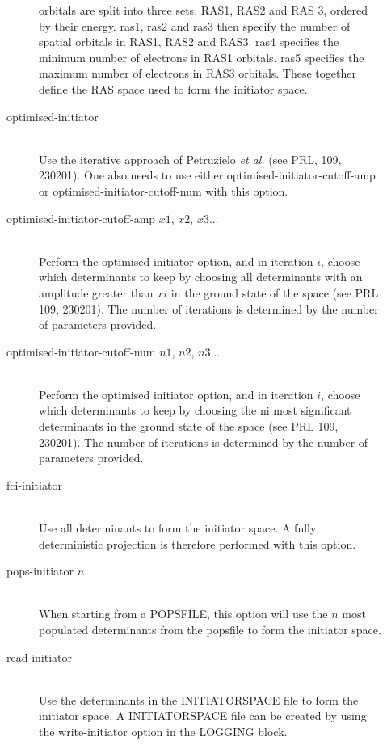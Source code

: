 \documentclass[a4paper,notitlepage]{scrreprt}
\newcommand\codeitem[1]{\needspace{1.5\baselineskip}\item[\textnormal{\ttfamily #1 \nopagebreak}] \hfill \\ \nopagebreak}
\begin{document}
\begin{description}
\begin{description}
    orbitals are split into three sets, RAS1, RAS2 and RAS 3, ordered
    by their energy. ras1, ras2 and ras3 then specify the number of
    spatial orbitals in RAS1, RAS2 and RAS3. ras4 specifies the minimum
    number of electrons in RAS1 orbitals. ras5 specifies the maximum
    number of electrons in RAS3 orbitals. These together define the RAS
    space used to form the initiator space.
    \codeitem{optimised-initiator}
    Use the iterative approach of Petruzielo \emph{et al.} (see PRL,
    109, 230201). One also needs to use either optimised-initiator-cutoff-amp
    or optimised-initiator-cutoff-num with this option.
    \codeitem{optimised-initiator-cutoff-amp $x1$, $x2$, $x3$...}
    Perform the optimised initiator option, and in iteration $i$, choose
    which determinants to keep by choosing all determinants with an
    amplitude greater than $xi$ in the ground state of the space (see
    PRL 109, 230201). The number of iterations is determined by the
    number of parameters provided.
    \codeitem{optimised-initiator-cutoff-num $n1$, $n2$, $n3$...}
    Perform the optimised initiator option, and in iteration $i$, choose
    which determinants to keep by choosing the ni most significant
    determinants in the ground state of the space (see PRL 109, 230201).
    The number of iterations is determined by the number of parameters
    provided.
    \codeitem{fci-initiator}
    Use all determinants to form the initiator space. A fully deterministic
    projection is therefore performed with this option.
    \codeitem{pops-initiator $n$}
    When starting from a POPSFILE, this option will use the $n$ most
    populated determinants from the popsfile to form the initiator space.
    \codeitem{read-initiator}
    Use the determinants in the INITIATORSPACE file to form the initiator space.
    A INITIATORSPACE file can be created by using the write-initiator option in
    the LOGGING block.
    \end{description}
  \end{description}
\end{document}
